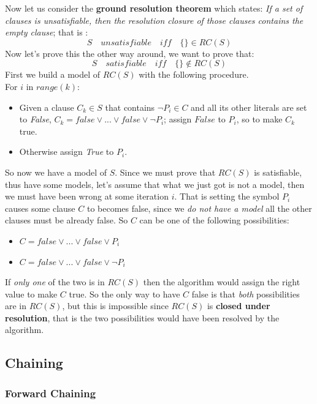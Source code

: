 \documentclass[10pt,a4paper]{article}
\begin{document}
Now let us consider the \textbf{ground resolution theorem} which states:
\textit{If a set of clauses is unsatisfiable, then the resolution closure of those clauses contains the empty clause}; that is :
\[S\quad unsatisfiable\quad iff\quad \{\}\in RC(S)\]
Now let's prove this the other way around, we want to prove that:
\[S\quad satisfiable\quad iff\quad \{\}\notin RC(S)\]
First we build a model of $RC(S)$ with the following procedure.\\ For $i$ in $range(k)$:
\begin{itemize}
\item Given a clause $C_k \in S$ that contains $\neg P_i \in C$ and all its other literals are set to \textit{False}, $C_k=false\vee...\vee false\vee \neg P_i$; assign $False$ to $P_i$, so to make $C_k$ true.
\item Otherwise assign \textit{True} to $P_i$.
\end{itemize}
So now we have a model of $S$. Since we must prove that $RC(S)$ is satisfiable, thus have some models, let's assume that what we just got is not a model, then we must have been wrong at some iteration $i$. That is setting the symbol $P_i$ causes some clause $C$ to becomes false, since we \textit{do not have a model} all the other clauses must be already false. So $C$ can be one of the following possibilities:
\begin{itemize}
\item $C=false\vee...\vee false\vee P_i$
\item $C=false\vee...\vee false\vee \neg P_i$
\end{itemize}
If \textit{only one} of the two is in $RC(S)$ then the algorithm would assign the right value to make $C$ true. So the only way to have $C$ false is that \textit{both} possibilities are in $RC(S)$, but this is impossible since $RC(S)$ is \textbf{closed under resolution}, that is the two possibilities would have been resolved by the algorithm.

\subsection{Chaining}
\label{subsec:chaining}


\subsubsection{Forward Chaining}
\end{document}
